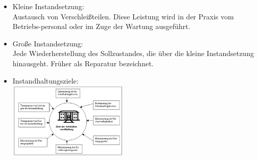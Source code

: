 \documentclass[fleqn,twoside,dvipsnames]{article}
\begin{document}
\begin{itemize}
\begin{itemize}
                    \item Kleine Instandsetzung:\\
                        Austausch von Verschleißteilen. Diese Leistung wird in der Praxis vom Betriebs-personal oder im Zuge der Wartung ausgeführt.
                    \item Große Instandsetzung:\\
                        Jede Wiederherstellung des Sollzustandes, die über die kleine Instandsetzung hinausgeht. Früher als Reparatur bezeichnet.
                    \item Instandhaltungsziele:\\
                        \includegraphics[width=0.45\textwidth]{Grafiken/Instandhaltung/Instandhaltungsziele.png}\\        
                \end{itemize}
        \end{itemize}
\end{document}
